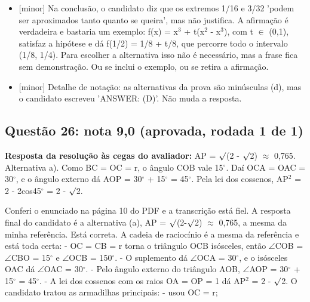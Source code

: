 \documentclass{article}%
\begin{document}
\begin{itemize}%
\item%
{[}minor{]} Na conclusão, o candidato diz que os extremos 1/16 e 3/32 'podem ser aproximados tanto quanto se queira', mas não justifica. A afirmação é verdadeira e bastaria um exemplo: f(x) = x$^3$ + t(x$^2$ - x$^3$), com t $\in$ (0,1), satisfaz a hipótese e dá f(1/2) = 1/8 + t/8, que percorre todo o intervalo (1/8, 1/4). Para escolher a alternativa isso não é necessário, mas a frase fica sem demonstração. Ou se inclui o exemplo, ou se retira a afirmação.%
\item%
{[}minor{]} Detalhe de notação: as alternativas da prova são minúsculas (d), mas o candidato escreveu 'ANSWER: (D)'. Não muda a resposta.%
\end{itemize}%
\subsection*{Questão 26: nota 9,0 (aprovada, rodada 1 de 1)}%
\textbf{Resposta da resolução às cegas do avaliador:} AP = $\surd$(2 - $\surd$2) $\approx$ 0,765. Alternativa a). Como BC = OC = r, o ângulo COB vale 15$^\circ$. Daí OCA = OAC = 30$^\circ$, e o ângulo externo dá AOP = 30$^\circ$ + 15$^\circ$ = 45$^\circ$. Pela lei dos cossenos, AP$^2$ = 2 - 2cos45$^\circ$ = 2 - $\surd$2.\par %
Conferi o enunciado na página 10 do PDF e a transcrição está fiel. A resposta final do candidato é a alternativa (a), AP = $\surd$(2-$\surd$2) $\approx$ 0,765, a mesma da minha referência. Está correta.\newline%
\newline%
A cadeia de raciocínio é a mesma da referência e está toda certa:\newline%
{-} OC = CB = r torna o triângulo OCB isósceles, então $\angle$COB = $\angle$CBO = 15$^\circ$ e $\angle$OCB = 150$^\circ$.\newline%
{-} O suplemento dá $\angle$OCA = 30$^\circ$, e o isósceles OAC dá $\angle$OAC = 30$^\circ$.\newline%
{-} Pelo ângulo externo do triângulo AOB, $\angle$AOP = 30$^\circ$ + 15$^\circ$ = 45$^\circ$.\newline%
{-} A lei dos cossenos com os raios OA = OP = 1 dá AP$^2$ = 2 - $\surd$2.\newline%
\newline%
O candidato tratou as armadilhas principais:\newline%
{-} usou OC = r;\newline%
\end{document}
